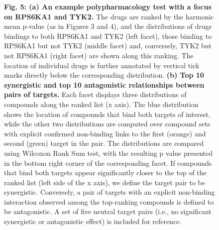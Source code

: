 \documentclass{article}
\begin{document}
\begin{figure}
  \caption{\textbf{Fig. 5: (a) An example polypharmacology test with a focus on RPS6KA1 and TYK2.} The drugs are ranked by the harmonic mean p-value (as in Figures 3 and 4), and the distributions of drugs bindings to both RPS6KA1 and TYK2 (left facet), those binding to RPS6KA1 but not TYK2 (middle facet) and, conversely, TYK2 but not RPS6KA1 (right facet) are shown along this ranking. The location of individual drugs is further annotated by vertical tick marks directly below the corresponding distribution. \textbf{(b) Top 10 synergistic and top 10 antagonistic relationships between pairs of targets.} Each facet displays three distributions of compounds along the ranked list (x axis). The blue distribution shows the location of compounds that bind both targets of interest, while the other two distributions are computed over compound sets with explicit confirmed non-binding links to the first (orange) and second (green) target in the pair. The distributions are compared using Wilcoxon Rank Sum test, with the resulting p value presented in the bottom right corner of the corresponding facet. If compounds that bind both targets appear significantly closer to the top of the ranked list (left side of the x axis), we define the target pair to be synergistic. Conversely, a pair of targets with an explicit non-binding interaction observed among the top-ranking compounds is defined to be antagonistic. A set of five neutral target pairs (i.e., no significant synergistic or antagonistic effect) is included for reference. }
\end{figure}
\end{document}

